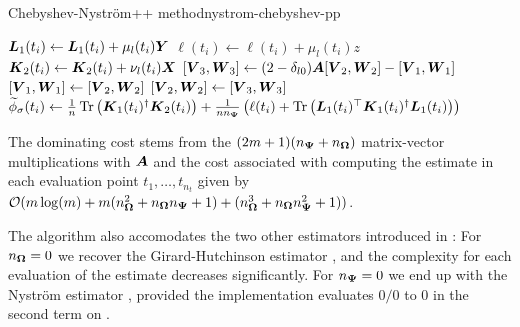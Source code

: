 \documentclass[12pt]{article}
\begin{document}
\begin{algo}{Chebyshev-Nyström++ method}{nystrom-chebyshev-pp}
\begin{algorithmic}[1]
            \State $\boldsymbol{L}_1(t_i) \gets \boldsymbol{L}_1(t_i) + \mu_l(t_i) \boldsymbol{Y}$ 
            \State $\ell(t_i) \gets \ell(t_i) + \mu_l(t_i) z$ 
        \EndIf
        \State $\boldsymbol{K}_2(t_i) \gets \boldsymbol{K}_2(t_i) + \nu_l(t_i) \boldsymbol{X}$ 
      \EndFor
      \State $[\boldsymbol{V}_3, \boldsymbol{W}_3] \gets (2 - \delta_{l0}) \boldsymbol{A} [\boldsymbol{V}_2, \boldsymbol{W}_2] - [\boldsymbol{V}_1, \boldsymbol{W}_1]$ 
      \State $[\boldsymbol{V}_1, \boldsymbol{W}_1] \gets [\boldsymbol{V}_2, \boldsymbol{W}_2]$
      \State $[\boldsymbol{V}_2, \boldsymbol{W}_2] \gets [\boldsymbol{V}_3, \boldsymbol{W}_3]$
    \EndFor
      \State $\widetilde{\phi}_{\sigma}(t_i) \gets \frac{1}{n} \operatorname{Tr}\left( \boldsymbol{K}_1(t_i)^{\dagger}\boldsymbol{K}_2(t_i) \right) + \frac{1}{n n_{\boldsymbol{\Psi}}} \left( \ell(t_i) + \operatorname{Tr}\left( \boldsymbol{L}_1(t_i)^{\top} \boldsymbol{K}_1(t_i)^{\dagger} \boldsymbol{L}_1(t_i) \right)  \right) $ \label{lin:4-nystromchebyshev-nystrom-pp}
    \EndFor
\end{algorithmic}
\end{algo}

The dominating cost stems from the $(2m + 1)(n_{\boldsymbol{\Psi}} + n_{\boldsymbol{\Omega}})$ matrix-vector multiplications with $\boldsymbol{A}$ and the cost associated with computing the estimate in each evaluation point $t_1, \dots, t_{n_t}$ given by $\mathcal{O}(m \log(m) + m (n_{\boldsymbol{\Omega}}^2 + n_{\boldsymbol{\Omega}} n_{\boldsymbol{\Psi}} + 1) + (n_{\boldsymbol{\Omega}}^3 + n_{\boldsymbol{\Omega}} n_{\boldsymbol{\Psi}}^2 + 1))$.

The algorithm also accomodates the two other estimators introduced in : For $n_{\boldsymbol{\Omega}} = 0$ we recover the Girard-Hutchinson estimator , and the complexity for each evaluation of the estimate decreases significantly. For $n_{\boldsymbol{\Psi}} = 0$ we end up with the Nyström estimator , provided the implementation evaluates $0/0$ to $0$ in the second term on .
\end{document}
